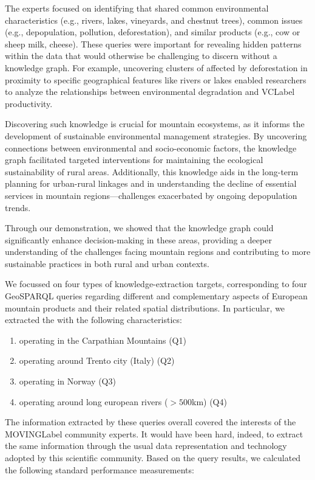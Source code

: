 The experts focused on identifying  that shared common environmental characteristics (e.g., rivers, lakes, vineyards, and chestnut trees), common issues (e.g., depopulation, pollution, deforestation), and similar products (e.g., cow or sheep milk, cheese). These queries were important for revealing hidden patterns within the data that would otherwise be challenging to discern without a knowledge graph. For example, uncovering clusters of  affected by deforestation in proximity to specific geographical features like rivers or lakes enabled researchers to analyze the relationships between environmental degradation and \acrshort{VCLabel} productivity.

Discovering such knowledge is crucial for mountain ecosystems, as it informs the development of sustainable environmental management strategies. By uncovering connections between environmental and socio-economic factors, the knowledge graph facilitated targeted interventions for maintaining the ecological sustainability of rural areas. Additionally, this knowledge aids in the long-term planning for urban-rural linkages and in understanding the decline of essential services in mountain regions—challenges exacerbated by ongoing depopulation trends.

Through our demonstration, we showed that the knowledge graph could significantly enhance decision-making in these areas, providing a deeper understanding of the challenges facing mountain regions and contributing to more sustainable practices in both rural and urban contexts.

We focussed on four types of knowledge-extraction targets, corresponding to four GeoSPARQL queries regarding different and complementary aspects of European mountain products and their related spatial distributions. In particular, we extracted the  with the following characteristics:
\begin{enumerate}
    \item operating in the Carpathian Mountains (Q1)
    \item operating around Trento city (Italy) (Q2)
    \item operating in Norway (Q3)
    \item operating around long european rivers ($>500$km) (Q4)
\end{enumerate}

The information extracted by these queries overall covered the interests of the \acrshort{MOVINGLabel} community experts. It would have been hard, indeed, to extract the same information through the usual data representation and technology adopted by this scientific community. Based on the query results, we calculated the following standard performance measurements: 


